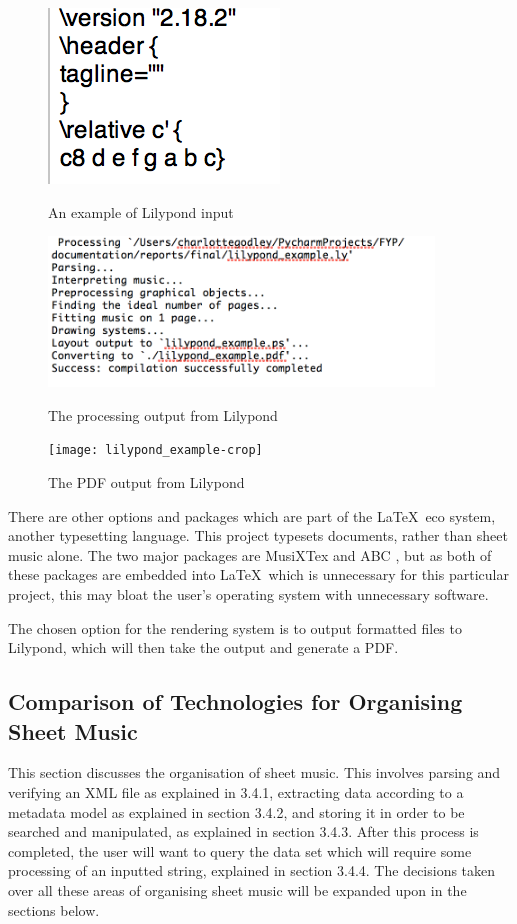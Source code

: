 \begin{figure}[H]
\centering
\begin{minipage}{120pt}
\centering
\includegraphics{lilypond}
\caption{An example of Lilypond input}
\label{fig:lilypond}
\end{minipage}	
\centering
\begin{minipage}{300pt}
\centering
\includegraphics[width=290pt]{lilypond_run}
\caption{The processing output from Lilypond}
\label{fig:lilypondrun}
\end{minipage}
\centering
\begin{minipage}{160pt}
\centering
\texttt{[image: lilypond\_example-crop]}
\caption{The PDF output from Lilypond}
\label{fig:lilypondres}
\end{minipage}
\end{figure}

There are other options and packages which are part of the \LaTeX\  
 eco system, another typesetting language. This project typesets documents, rather than sheet music alone. The two major packages are MusiXTex and ABC \parencite{musixtex}, but as both of these packages are embedded into \LaTeX\
 which is unnecessary for this particular project, this may bloat the user's operating system with unnecessary software.

The chosen option for the rendering system is to output formatted files to Lilypond, which will then take the output and generate a PDF.

\subsection{Comparison of Technologies for Organising Sheet Music}
This section discusses the organisation of sheet music. This involves parsing and verifying an XML file as explained in 3.4.1, extracting data according to a metadata model as explained in section 3.4.2, and storing it in order to be searched and manipulated, as explained in section 3.4.3. After this process is completed, the user will want to query the data set which will require some processing of an inputted string, explained in section 3.4.4. The decisions taken over all these areas of organising sheet music will be expanded upon in the sections below.
